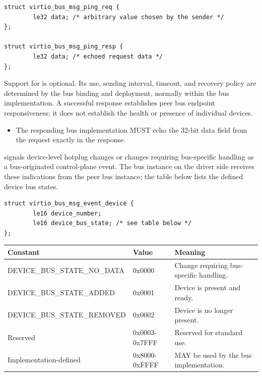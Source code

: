 \begin{lstlisting}
struct virtio_bus_msg_ping_req {
        le32 data; /* arbitrary value chosen by the sender */
};

struct virtio_bus_msg_ping_resp {
        le32 data; /* echoed request data */
};
\end{lstlisting}

Support for  is optional. Its use, sending interval, timeout, and
recovery policy are determined by the bus binding and deployment, normally
within the bus implementation. A successful response establishes peer bus
endpoint responsiveness; it does not establish the health or presence of
individual devices.

\begin{itemize}
  \item The responding bus implementation MUST echo the 32-bit data field from
        the request exactly in the  response.
\end{itemize}


 signals device-level hotplug changes or changes requiring
bus-specific handling as a bus-originated control-plane event. The bus instance
on the driver side receives these indications from the peer bus instance; the
table below lists the defined device bus states.

\begin{lstlisting}
struct virtio_bus_msg_event_device {
        le16 device_number;
        le16 device_bus_state; /* see table below */
};
\end{lstlisting}

\begin{tabular}{|l|l|p{7cm}|}
\hline
Constant & Value & Meaning \\
\hline
DEVICE\_BUS\_STATE\_NO\_DATA  & 0x0000 & Change requiring bus-specific handling. \\
DEVICE\_BUS\_STATE\_ADDED    & 0x0001 & Device is present and ready. \\
DEVICE\_BUS\_STATE\_REMOVED  & 0x0002 & Device is no longer present. \\
Reserved                    & 0x0003-0x7FFF & Reserved for standard use. \\
Implementation-defined      & 0x8000-0xFFFF & MAY be used by the bus implementation. \\
\hline
\end{tabular}

